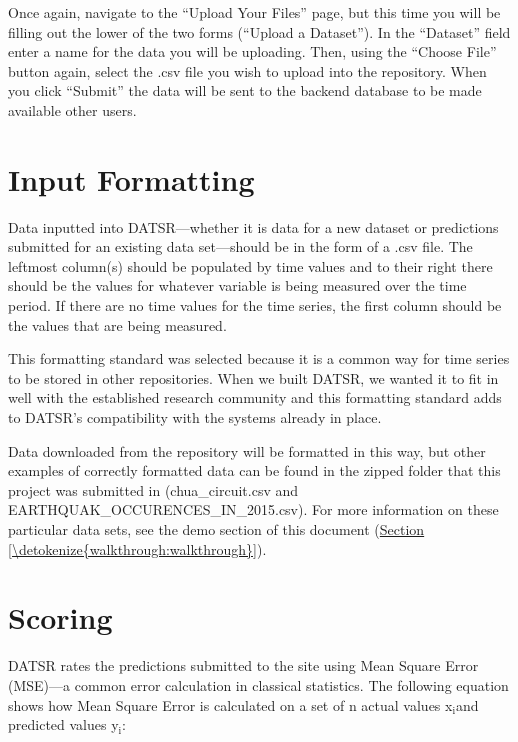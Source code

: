 \documentclass[letterpaper,10pt,english,openany,oneside]{sphinxmanual}
\begin{document}
\sphinxAtStartPar
Once again, navigate to the “Upload Your Files” page, but this time you will be filling out the lower of the two forms (“Upload a Dataset”). In the “Dataset” field enter a name for the data you will be uploading. Then, using the “Choose File” button again, select the .csv file you wish to upload into the repository. When you click “Submit” the data will be sent to the backend database to be made available other users.

\sphinxstepscope


\chapter{Input Formatting}
\label{\detokenize{input_formatting:input-formatting}}\label{\detokenize{input_formatting:input}}\label{\detokenize{input_formatting::doc}}
\sphinxAtStartPar
Data inputted into DATSR—whether it is data for a new dataset or predictions submitted for an existing data set—should be in the form of a .csv file. The left\sphinxhyphen{}most column(s) should be populated by time values and to their right there should be the values for whatever variable is being measured over the time period. If there are no time values for the time series, the first column should be the values that are being measured.

\sphinxAtStartPar
This formatting standard was selected because it is a common way for time series to be stored in other repositories. When we built DATSR, we wanted it to fit in well with the established research community and this formatting standard adds to DATSR’s compatibility with the systems already in place.

\sphinxAtStartPar
Data downloaded from the repository will be formatted in this way, but other examples of correctly formatted data can be found in the zipped folder that this project was submitted in (chua\_circuit.csv and EARTHQUAK\_OCCURENCES\_IN\_2015.csv). For more information on these particular data sets, see the demo section of this document (\hyperref[\detokenize{walkthrough:walkthrough}]{Section \ref{\detokenize{walkthrough:walkthrough}}}).

\sphinxstepscope


\chapter{Scoring}
\label{\detokenize{scoring:scoring}}\label{\detokenize{scoring:id1}}\label{\detokenize{scoring::doc}}
\sphinxAtStartPar
DATSR rates the predictions submitted to the site using Mean Square Error (MSE)—a common error calculation in classical statistics. The following equation shows how Mean Square Error is calculated on a set of n actual values x$_{\text{i}}$and predicted values y$_{\text{i}}$:
\end{document}
